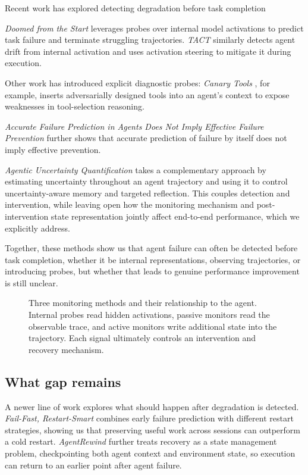 \documentclass{article}
\begin{document}
Recent work has explored detecting degradation before task completion

\emph{Doomed from the Start} \citep{ruan2026doomed} leverages probes over internal model activations to predict task failure and terminate struggling trajectories. \emph{TACT} \citep{sui2026tact} similarly detects agent drift from internal activation and uses activation steering to mitigate it during execution.

Other work has introduced explicit diagnostic probes: \emph{Canary Tools} \citep{anand2026canary}, for example, inserts adversarially designed tools into an agent's context to expose weaknesses in tool-selection reasoning.

\emph{Accurate Failure Prediction in Agents Does Not Imply Effective Failure Prevention} \citep{anonymous2026intervention} further shows that accurate prediction of failure by itself does not imply effective prevention.

\emph{Agentic Uncertainty Quantification} \citep{zhang2026agentic} takes a complementary approach by estimating uncertainty throughout an agent trajectory and using it to control uncertainty-aware memory and targeted reflection. This couples detection and intervention, while leaving open how the monitoring mechanism and post-intervention state representation jointly affect end-to-end performance, which we explicitly address.

Together, these methods show us that agent failure can often be detected before task completion, whether it be internal representations, observing trajectories, or introducing probes, but whether that leads to genuine performance improvement is still unclear.

\begin{figure}[t]
  \centering
  
  \caption{Three monitoring methods and their relationship to the agent. Internal probes read hidden activations, passive monitors read the observable trace, and active monitors write additional state into the trajectory. Each signal ultimately controls an intervention and recovery mechanism.}
  \label{fig:monitor-taxonomy}
\end{figure}

\subsection{What gap remains}

A newer line of work explores what should happen after degradation is detected. \emph{Fail-Fast, Restart-Smart} \citep{wang2026failfast} combines early failure prediction with different restart strategies, showing us that preserving useful work across sessions can outperform a cold restart. \emph{AgentRewind} \citep{zhuang2026agentrewind} further treats recovery as a state management problem, checkpointing both agent context and environment state, so execution can return to an earlier point after agent failure.
\end{document}
